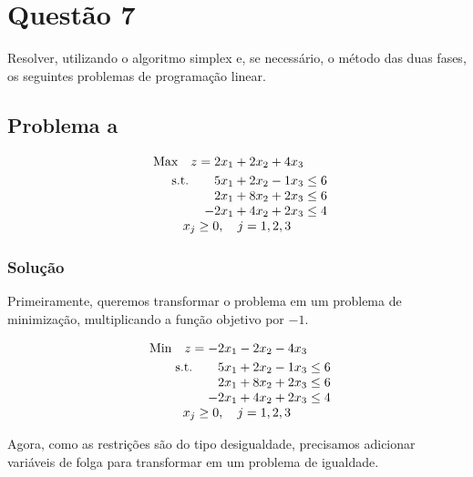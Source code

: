 \documentclass{article}
\begin{document}
\section{Questão 7}

Resolver, utilizando o algoritmo simplex e, se necessário, o método das duas fases, os seguintes problemas de programação linear.

\subsection{Problema a}

\[
  \begin{array}{r@{}r@{}r@{}r@{}r@{}r}
    \text{Max} \quad z =   2x_1 &{} + 2x_2 &{} + 4x_3 &{} \\[\jot]
    \text{s.t.}\quad\quad  5x_1 &{} + 2x_2 &{} - 1x_3 &{} \leq 6\\
                           2x_1 &{} + 8x_2 &{} + 2x_3 &{} \leq 6\\
                          -2x_1 &{} + 4x_2 &{} + 2x_3 &{} \leq 4\\

    \multicolumn{4}{c}{x_j \geq 0, \quad j=1, 2, 3}
  \end{array}
\]

\subsubsection{Solução}

Primeiramente, queremos transformar o problema em um problema de minimização, multiplicando a função objetivo por $-1$.

\[
  \begin{array}{r@{}r@{}r@{}r@{}r@{}r}
    \text{Min} \quad z =  -2x_1 &{} - 2x_2 &{} - 4x_3 &{} \\[\jot]
    \text{s.t.}\quad\quad  5x_1 &{} + 2x_2 &{} - 1x_3 &{} \leq 6\\
                           2x_1 &{} + 8x_2 &{} + 2x_3 &{} \leq 6\\
                          -2x_1 &{} + 4x_2 &{} + 2x_3 &{} \leq 4\\

    \multicolumn{4}{c}{x_j \geq 0, \quad j=1, 2, 3}
  \end{array}
\]

Agora, como as restrições são do tipo desigualdade, precisamos adicionar variáveis de folga para transformar em um problema de igualdade.
\end{document}
